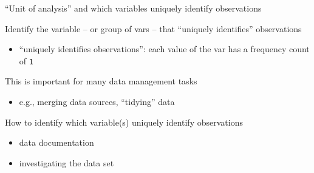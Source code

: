 \documentclass[8pt,ignorenonframetext,dvipsnames]{beamer}
\newenvironment{Shaded}{\begin{snugshade}}{\end{snugshade}}
\newcommand{\KeywordTok}[1]{\textcolor[rgb]{0.13,0.29,0.53}{\textbf{#1}}}
\newcommand{\DataTypeTok}[1]{\textcolor[rgb]{0.13,0.29,0.53}{#1}}
\newcommand{\DecValTok}[1]{\textcolor[rgb]{0.00,0.00,0.81}{#1}}
\newcommand{\StringTok}[1]{\textcolor[rgb]{0.31,0.60,0.02}{#1}}
\newcommand{\CommentTok}[1]{\textcolor[rgb]{0.56,0.35,0.01}{\textit{#1}}}
\newcommand{\OperatorTok}[1]{\textcolor[rgb]{0.81,0.36,0.00}{\textbf{#1}}}
\newcommand{\NormalTok}[1]{#1}
\providecommand{\tightlist}{%
  \setlength{\itemsep}{0pt}\setlength{\parskip}{0pt}}
\renewcommand{\textbf}[1]{{\color{darkgray}\bfseries\fontfamily{Montserrat-TOsF}#1}}
\begin{document}
\begin{frame}[fragile]{``Unit of analysis'' and which variables uniquely
identify observations}

Identify the variable -- or group of vars -- that ``uniquely
identifies'' observations

\begin{itemize}
\tightlist
\item
  ``uniquely identifies observations'': each value of the var has a
  frequency count of \texttt{1}
\end{itemize}

This is important for many data management tasks

\begin{itemize}
\tightlist
\item
  e.g., merging data sources, ``tidying'' data
\end{itemize}

How to identify which variable(s) uniquely identify observations

\begin{itemize}
\tightlist
\item
  data documentation
\item
  investigating the data set
\end{itemize}

\begin{Shaded}
\end{Shaded}

\end{frame}
\end{document}
